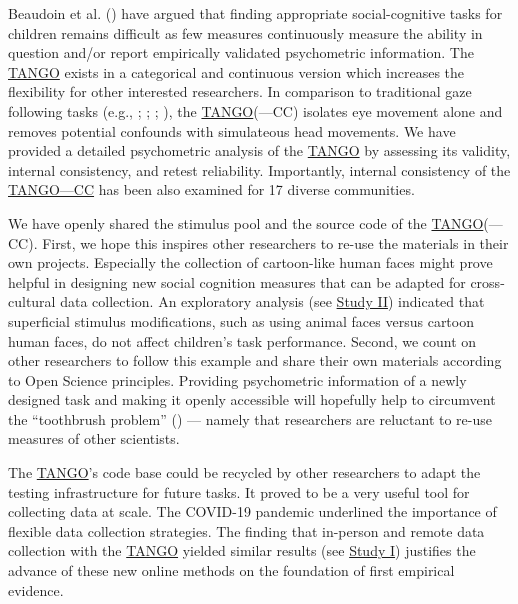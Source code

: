 \documentclass[
]{scrbook}
\begin{document}
Beaudoin et al. () have argued that finding appropriate social-cognitive tasks for children remains difficult as few measures continuously measure the ability in question and/or report empirically validated psychometric information. The \hyperref[acronyms_TANGO]{TANGO} exists in a categorical and continuous version which increases the flexibility for other interested researchers. In comparison to traditional gaze following tasks (e.g., ; ; ; ), the \hyperref[acronyms_TANGO]{TANGO}(---CC) isolates eye movement alone and removes potential confounds with simulateous head movements. We have provided a detailed psychometric analysis of the \hyperref[acronyms_TANGO]{TANGO} by assessing its validity, internal consistency, and retest reliability. Importantly, internal consistency of the \hyperref[acronyms_TANGOux2014CC]{TANGO---CC} has been also examined for 17 diverse communities.

We have openly shared the stimulus pool and the source code of the \hyperref[acronyms_TANGO]{TANGO}(---CC). First, we hope this inspires other researchers to re-use the materials in their own projects. Especially the collection of cartoon-like human faces might prove helpful in designing new social cognition measures that can be adapted for cross-cultural data collection. An exploratory analysis (see \hyperref[studyII]{Study II}) indicated that superficial stimulus modifications, such as using animal faces versus cartoon human faces, do not affect children's task performance. Second, we count on other researchers to follow this example and share their own materials according to Open Science principles. Providing psychometric information of a newly designed task and making it openly accessible will hopefully help to circumvent the ``toothbrush problem'' () --- namely that researchers are reluctant to re-use measures of other scientists.

The \hyperref[acronyms_TANGO]{TANGO}'s code base could be recycled by other researchers to adapt the testing infrastructure for future tasks. It proved to be a very useful tool for collecting data at scale. The COVID-19 pandemic underlined the importance of flexible data collection strategies. The finding that in-person and remote data collection with the \hyperref[acronyms_TANGO]{TANGO} yielded similar results (see \hyperref[studyI]{Study I}) justifies the advance of these new online methods on the foundation of first empirical evidence.
\end{document}
